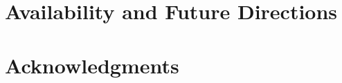 \documentclass[aps,pre,twocolumn,nofootinbib,superscriptaddress,linenumbers]{revtex4-1}
\begin{document}
%
%
%
%
%

\section{Availability and Future Directions}
\label{section:availability}

\section{Acknowledgments}
\label{section:acknowledgments}


% 

\end{document}
